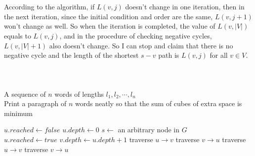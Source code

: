 \documentclass{article}
\begin{document}
\section{}

\begin{multicols}{2}

\end{multicols}

\section{}
According to the algorithm, if $L(v, j)$ doesn't change in one iteration, then in the next iteration, since the initial condition and order are the same, $L(v, j+1)$ won't change as well. So when the iteration is completed, the value of $L(v, |V|)$ equals to $L(v, j)$, and in the procedure of checking negative cycles, $L(v, |V|+1)$ also doesn't change. So I can stop and claim that there is no negative cycle and the length of the shortest $s-v$ path is $L(v, j)$ for all $v \in V $.

\section{}
\begin{algorithm}[H]
	\begin{algorithmic}
		\Require \\
			A sequence of $n$ words of lengths $l_1,l_2,\cdots,l_n$
		\Ensure \\
			Print a paragraph of $n$ words neatly so that the sum of cubes of extra space is minimum
		
		    
		\EndFor
		
			\State $u.reached \gets false$
			\State $u.depth \gets 0$
		\EndFor
		\State $s \gets$ an arbitrary node in $G$
		\State {}
		\\
			\State $u.reached \gets true$
					\State $v.depth \gets u.depth + 1$
					\State traverse $u \to v$
					\State \Call {DFS}{$v$}
					\State traverse $v \to u$
					\State traverse $u \to v$
					\State traverse $v \to u$
				\EndIf
			\EndFor
		\EndFunction

	\end{algorithmic}
\end{algorithm}
\end{document}
